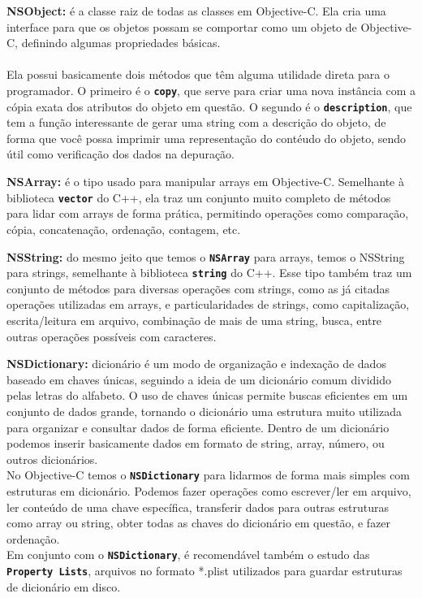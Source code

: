 \documentclass[a4paper,12pt,brazil,doubleside]{book}
\begin{document}
\bigskip

\begin{description}
\item{\textbf{NSObject:} é a classe raiz de todas as classes em Objective-C. Ela cria uma interface para que os objetos possam se comportar como um objeto de Objective-C, definindo algumas propriedades básicas.
\paragraph{}Ela possui basicamente dois métodos que têm alguma utilidade direta para o programador. O primeiro é o \texttt{\textbf{copy}}, que serve para criar uma nova instância com a cópia exata dos atributos do objeto em questão. O segundo é o \texttt{\textbf{description}}, que tem a função interessante de gerar uma string com a descrição do objeto, de forma que você possa imprimir uma representação do contéudo do objeto, sendo útil como verificação dos dados na depuração.}

\item{\textbf{NSArray:} é o tipo usado para manipular arrays em Objective-C. Semelhante à biblioteca \texttt{\textbf{vector}} do C++, ela traz um conjunto muito completo de métodos para lidar com arrays de forma prática, permitindo operações como comparação, cópia, concatenação, ordenação, contagem, etc.}

\item{\textbf{NSString:} do mesmo jeito que temos o \texttt{\textbf{NSArray}} para arrays, temos o NSString para strings, semelhante à biblioteca \texttt{\textbf{string}} do C++. Esse tipo também traz um conjunto de métodos para diversas operações com strings, como as já citadas operações utilizadas em arrays, e particularidades de strings, como capitalização, escrita/leitura em arquivo, combinação de mais de uma string, busca, entre outras operações possíveis com caracteres.}

\item{\textbf{NSDictionary:} dicionário é um modo de organização e indexação de dados baseado em chaves únicas, seguindo a ideia de um dicionário comum dividido pelas letras do alfabeto. O uso de chaves únicas permite buscas eficientes em um conjunto de dados grande, tornando o dicionário uma estrutura muito utilizada para organizar e consultar dados de forma eficiente. Dentro de um dicionário podemos inserir basicamente dados em formato de string, array, número, ou outros dicionários.\\
No Objective-C temos o \texttt{\textbf{NSDictionary}} para lidarmos de forma mais simples com estruturas em dicionário. Podemos fazer operações como escrever/ler em arquivo, ler conteúdo de uma chave específica, transferir dados para outras estruturas como array ou string, obter todas as chaves do dicionário em questão, e fazer ordenação.\\
Em conjunto com o \texttt{\textbf{NSDictionary}}, é recomendável também o estudo das \texttt{\textbf{Property Lists}}, arquivos no formato *.plist utilizados para guardar estruturas de dicionário em disco.}


\end{description}
\end{document}
